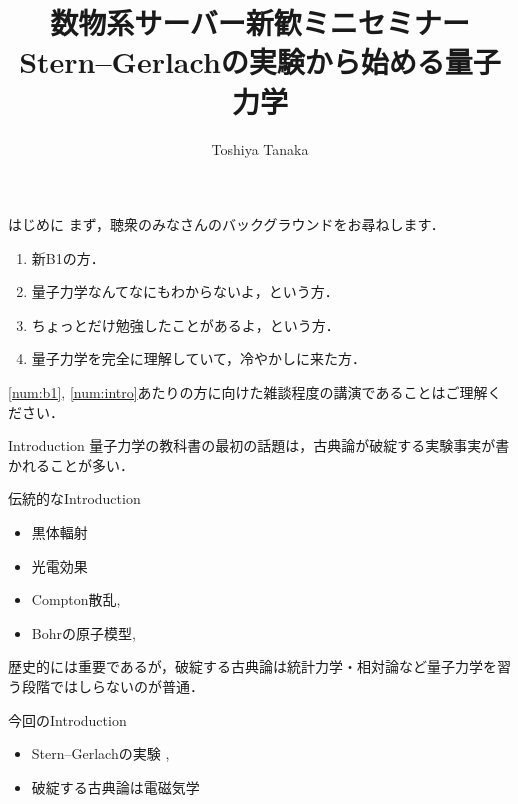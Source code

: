 \documentclass[dvipdfmx]{beamer}
\author[T. Tanaka]{Toshiya Tanaka}
\institute[Univ. Toyama]{富山大学理学部物理学科}
\title[\textcolor{white}{SGEから始めるQM}]{数物系サーバー新歓ミニセミナー\\
Stern--Gerlachの実験から始める量子力学}
\theoremstyle{break}
\begin{document}
\begin{frame}
		\maketitle
\end{frame}


\begin{frame}{はじめに}
		まず，聴衆のみなさんのバックグラウンドをお尋ねします．

		\begin{enumerate}
				[default]
				\item 新B1の方．\label{num:b1}
				\item 量子力学なんてなにもわからないよ，という方．\label{num:intro}
				\item ちょっとだけ勉強したことがあるよ，という方．
				\item 量子力学を完全に理解していて，冷やかしに来た方．
		\end{enumerate}

		\ref{num:b1}, \ref{num:intro}あたりの方に向けた雑談程度の講演であることはご理解ください．
\end{frame}


\begin{frame}{Introduction}
		量子力学の教科書の最初の話題は，古典論が破綻する実験事実が書かれることが多い．
		\begin{block}{伝統的なIntroduction}
		\begin{itemize}
				\item 黒体輻射\cite[\S1.1]{BN10398292}
				\item 光電効果\cite[\S1.2]{BN10398292}
				\item Compton散乱\cite[\S1.3]{BN10398292}, \cite[\S1.1, (1)]{BN0611143X}
				\item Bohrの原子模型\cite[\S1.6]{BN10398292}, \cite[\S1.1, (2)]{BN0611143X}
		\end{itemize}
		歴史的には重要であるが，破綻する古典論は統計力学・相対論など量子力学を習う段階ではしらないのが普通．
		\end{block}
		\begin{alertblock}{今回のIntroduction}
				\begin{itemize}
				\item Stern--Gerlachの実験 \cite{BC01962771}, \cite{BC08412531}
				\item 破綻する古典論は電磁気学
				\end{itemize}
		\end{alertblock}
\end{frame}
\end{document}
